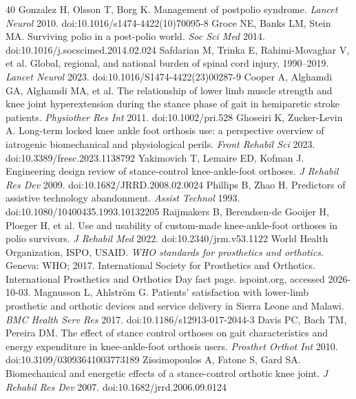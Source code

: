 \documentclass[11pt,a4paper]{article}
\begin{document}

\begin{thebibliography}{40}\small
{} Gonzalez H, Olsson T, Borg K. Management of postpolio syndrome. \emph{Lancet Neurol} 2010. doi:10.1016/s1474-4422(10)70095-8
 Groce NE, Banks LM, Stein MA. Surviving polio in a post-polio world. \emph{Soc Sci Med} 2014. doi:10.1016/j.socscimed.2014.02.024
 Safdarian M, Trinka E, Rahimi-Movaghar V, et al. Global, regional, and national burden of spinal cord injury, 1990--2019. \emph{Lancet Neurol} 2023. doi:10.1016/S1474-4422(23)00287-9
 Cooper A, Alghamdi GA, Alghamdi MA, et al. The relationship of lower limb muscle strength and knee joint hyperextension during the stance phase of gait in hemiparetic stroke patients. \emph{Physiother Res Int} 2011. doi:10.1002/pri.528
 Ghoseiri K, Zucker-Levin A. Long-term locked knee ankle foot orthosis use: a perspective overview of iatrogenic biomechanical and physiological perils. \emph{Front Rehabil Sci} 2023. doi:10.3389/fresc.2023.1138792
 Yakimovich T, Lemaire ED, Kofman J. Engineering design review of stance-control knee-ankle-foot orthoses. \emph{J Rehabil Res Dev} 2009. doi:10.1682/JRRD.2008.02.0024
 Phillips B, Zhao H. Predictors of assistive technology abandonment. \emph{Assist Technol} 1993. doi:10.1080/10400435.1993.10132205
 Raijmakers B, Berendsen-de Gooijer H, Ploeger H, et al. Use and usability of custom-made knee-ankle-foot orthoses in polio survivors. \emph{J Rehabil Med} 2022. doi:10.2340/jrm.v53.1122
 World Health Organization, ISPO, USAID. \emph{WHO standards for prosthetics and orthotics}. Geneva: WHO; 2017.
 International Society for Prosthetics and Orthotics. International Prosthetics and Orthotics Day fact page. ispoint.org, accessed 2026-10-03.
 Magnusson L, Ahlstr\"om G. Patients' satisfaction with lower-limb prosthetic and orthotic devices and service delivery in Sierra Leone and Malawi. \emph{BMC Health Serv Res} 2017. doi:10.1186/s12913-017-2044-3
 Davis PC, Bach TM, Pereira DM. The effect of stance control orthoses on gait characteristics and energy expenditure in knee-ankle-foot orthosis users. \emph{Prosthet Orthot Int} 2010. doi:10.3109/03093641003773189
 Zissimopoulos A, Fatone S, Gard SA. Biomechanical and energetic effects of a stance-control orthotic knee joint. \emph{J Rehabil Res Dev} 2007. doi:10.1682/jrrd.2006.09.0124

\end{thebibliography}
\end{document}
